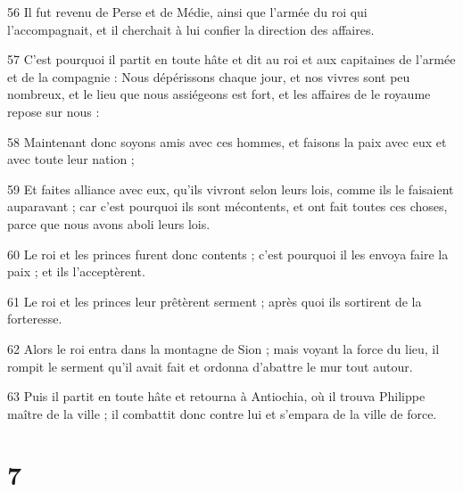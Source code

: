 \par 56 Il fut revenu de Perse et de Médie, ainsi que l'armée du roi qui l'accompagnait, et il cherchait à lui confier la direction des affaires.
\par 57 C'est pourquoi il partit en toute hâte et dit au roi et aux capitaines de l'armée et de la compagnie : Nous dépérissons chaque jour, et nos vivres sont peu nombreux, et le lieu que nous assiégeons est fort, et les affaires de le royaume repose sur nous :
\par 58 Maintenant donc soyons amis avec ces hommes, et faisons la paix avec eux et avec toute leur nation ;
\par 59 Et faites alliance avec eux, qu'ils vivront selon leurs lois, comme ils le faisaient auparavant ; car c'est pourquoi ils sont mécontents, et ont fait toutes ces choses, parce que nous avons aboli leurs lois.
\par 60 Le roi et les princes furent donc contents ; c'est pourquoi il les envoya faire la paix ; et ils l'acceptèrent.
\par 61 Le roi et les princes leur prêtèrent serment ; après quoi ils sortirent de la forteresse.
\par 62 Alors le roi entra dans la montagne de Sion ; mais voyant la force du lieu, il rompit le serment qu'il avait fait et ordonna d'abattre le mur tout autour.
\par 63 Puis il partit en toute hâte et retourna à Antiochia, où il trouva Philippe maître de la ville ; il combattit donc contre lui et s'empara de la ville de force.

\chapter{7}

